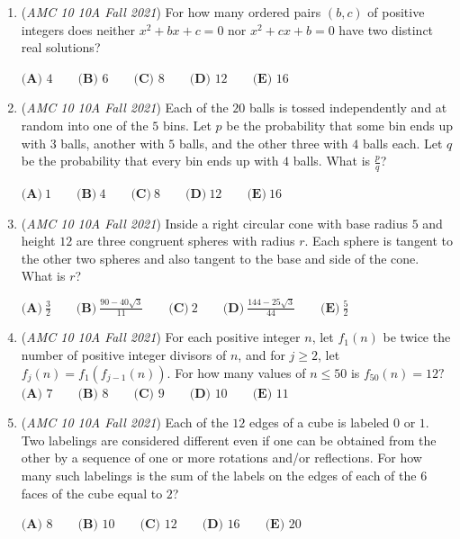 \begin{enumerate}
 $\textbf{(A)} ~10\qquad\textbf{(B)} ~11\qquad\textbf{(C)} ~12\qquad\textbf{(D)} ~13\qquad\textbf{(E)} ~14$


	\item (\textit{AMC 10 10A Fall 2021}) For how many ordered pairs $(b,c)$ of positive integers does neither $x^2+bx+c=0$ nor $x^2+cx+b=0$ have two distinct real solutions?


 $\textbf{(A) } 4 \qquad \textbf{(B) } 6 \qquad \textbf{(C) } 8 \qquad \textbf{(D) } 12 \qquad \textbf{(E) } 16 \qquad$


	\item (\textit{AMC 10 10A Fall 2021}) Each of the $20$ balls is tossed independently and at random into one of the $5$ bins. Let $p$ be the probability that some bin ends up with $3$ balls, another with $5$ balls, and the other three with $4$ balls each. Let $q$ be the probability that every bin ends up with $4$ balls. What is \(\frac{p}{q}\)?


 $\textbf{(A)}\ 1 \qquad\textbf{(B)}\  4 \qquad\textbf{(C)}\  8 \qquad\textbf{(D)}\  12 \qquad\textbf{(E)}\ 16$


	\item (\textit{AMC 10 10A Fall 2021}) Inside a right circular cone with base radius $5$ and height $12$ are three congruent spheres with radius $r$. Each sphere is tangent to the other two spheres and also tangent to the base and side of the cone. What is $r$?


 $\textbf{(A)}\ \frac{3}{2} \qquad\textbf{(B)}\ \frac{90-40\sqrt{3}}{11} \qquad\textbf{(C)}\ 2 \qquad\textbf{(D)}\ \frac{144-25\sqrt{3}}{44} \qquad\textbf{(E)}\ \frac{5}{2}$


	\item (\textit{AMC 10 10A Fall 2021}) For each positive integer $n$, let $f_1(n)$ be twice the number of positive integer divisors of $n$, and for $j \ge 2$, let $f_j(n) = f_1(f_{j-1}(n))$. For how many values of $n \le 50$ is $f_{50}(n) = 12?$
$\textbf{(A) }7\qquad\textbf{(B) }8\qquad\textbf{(C) }9\qquad\textbf{(D) }10\qquad\textbf{(E) }11$


	\item (\textit{AMC 10 10A Fall 2021}) Each of the $12$ edges of a cube is labeled $0$ or $1$. Two labelings are considered different even if one can be obtained from the other by a sequence of one or more rotations and/or reflections. For how many such labelings is the sum of the labels on the edges of each of the $6$ faces of the cube equal to $2$?


 $\textbf{(A) } 8 \qquad\textbf{(B) } 10 \qquad\textbf{(C) } 12 \qquad\textbf{(D) } 16 \qquad\textbf{(E) } 20$



\end{enumerate}
